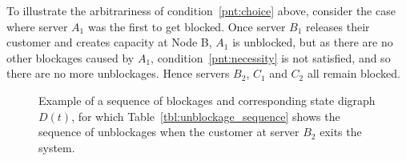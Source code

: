 \documentclass{article}
\begin{document}
To illustrate the arbitrariness of condition~\ref{pnt:choice} above, consider
the case where server $A_1$ was the first to get blocked.
Once server $B_1$ releases their customer and creates capacity at Node B, $A_1$
is unblocked, but as there are no other blockages caused by $A_1$,
condition~\ref{pnt:necessity} is not satisfied, and so there are no more
unblockages.
Hence servers $B_2$, $C_1$ and $C_2$ all remain blocked.

\begin{figure}
\begin{center}

\end{center}
\caption{Example of a sequence of blockages and corresponding state digraph
$D(t)$, for which Table~\ref{tbl:unblockage_sequence} shows the sequence of
unblockages when the customer at server $B_2$ exits the system.}
\label{fig:example_unblockages}
\end{figure}
\end{document}
